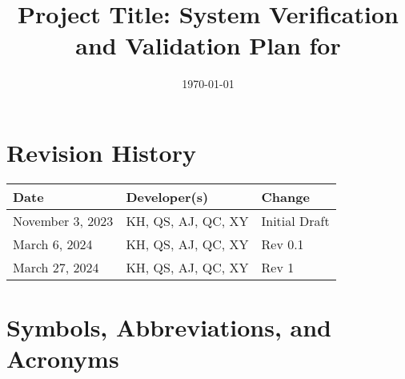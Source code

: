 \documentclass[12pt, titlepage]{article}
\begin{document}
\title{Project Title: System Verification and Validation Plan for \progname{}}
\author{\authname}
\date{\today}

\maketitle


\section*{Revision History}

\begin{tabularx}{\textwidth}{llX}
\toprule {\bf Date} & {\bf Developer(s)} & {\bf Change} \\
\midrule
November 3, 2023 & KH, QS, AJ, QC, XY & Initial Draft \\
March 6, 2024 & KH, QS, AJ, QC, XY & Rev 0.1 \\
March 27, 2024 & KH, QS, AJ, QC, XY & Rev 1 \\
\bottomrule
\end{tabularx}

\newpage

\tableofcontents

\listoftables

\newpage

\section{Symbols, Abbreviations, and Acronyms}
\end{document}
